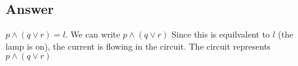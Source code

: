 \documentclass[17pt]{extarticle}
\begin{document}
\begin{fleqn}

\subsection*{Answer}
$p \wedge (q \vee r) = l$. We can write $p \wedge (q \vee r)$ Since this is equilvalent to $l$ (the lamp is on), the current is flowing in the circuit. The circuit represents $p \wedge (q \vee r)$



\end{fleqn}
\end{document}
